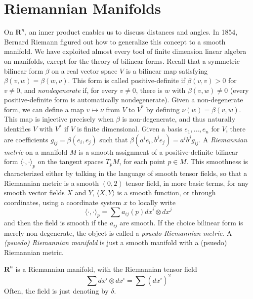 \chapter{Riemannian Manifolds}

On $\mathbf{R}^n$, an inner product enables us to discuss distances and angles. In 1854, Bernard Riemann figured out how to generalize this concept to a smooth manifold. We have exploited almost every tool of finite dimension linear algebra on manifolds, except for the theory of bilinear forms. Recall that a symmetric bilinear form $\beta$ on a real vector space $V$ is a bilinear map satisfying $\beta(v,w) = \beta(w,v)$. This form is called positive-definite if $\beta(v,v) > 0$ for $v \neq 0$, and {\it nondegenerate} if, for every $v \neq 0$, there is $w$ with $\beta(v,w) \neq 0$ (every positive-definite form is automatically nondegenerate). Given a non-degenerate form, we can define a map $v \mapsto \nu$ from $V$ to $V^*$ by defining $\nu(w) = \beta(v,w)$. This map is injective precisely when $\beta$ is non-degenerate, and thus naturally identifies $V$ with $V^*$ if $V$ is finite dimensional. Given a basis $e_1, \dots, e_n$ for $V$, there are coefficients $g_{ij} = \beta(e_i,e_j)$ such that $\beta(a^ie_i, b^je_j) = a^i b^j g_{ij}$. A \emph{Riemannian metric} on a manifold $M$ is a smooth assignment of a positive-definite bilinear form $\langle \cdot, \cdot \rangle_p$ on the tangent spaces $T_p M$, for each point $p \in M$. This smoothness is characterized either by talking in the language of smooth tensor fields, so that a Riemannian metric is a smooth $(0,2)$ tensor field, in more basic terms, for any smooth vector fields $X$ and $Y$, $\langle X, Y \rangle$ is a smooth function, or through coordinates, using a coordinate system $x$ to locally write
%
\[ \langle \cdot, \cdot \rangle_p = \sum a_{ij}(p) dx^i \otimes dx^j \]
%
and then the field is smooth if the $a_{ij}$ are smooth. If the choice bilinear form is merely non-degenerate, the object is called a \emph{psuedo-Riemannian metric}. A \emph{(psuedo) Riemannian manifold} is just a smooth manifold with a (psuedo) Riemannian metric.

\begin{example}
    $\mathbf{R}^n$ is a Riemannian manifold, with the Riemannian tensor field
    \[ \sum dx^i \otimes dx^i = \sum (dx^i)^2 \]
    Often, the field is just denoting by $\delta$.
\end{example}

